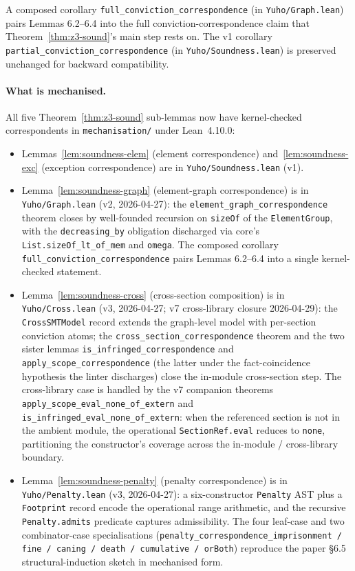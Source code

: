 A composed corollary \texttt{full\_conviction\_correspondence}
(in \texttt{Yuho/Graph.lean}) pairs Lemmas 6.2--6.4 into the
full conviction-correspondence claim that
Theorem~\ref{thm:z3-sound}'s main step rests on. The v1
corollary \texttt{partial\_conviction\_correspondence} (in
\texttt{Yuho/Soundness.lean}) is preserved unchanged for
backward compatibility.

\paragraph{What is mechanised.}
All five Theorem~\ref{thm:z3-sound} sub-lemmas now have
kernel-checked correspondents in
\texttt{mechanisation/} under Lean~4.10.0:

\begin{itemize}
  \item Lemmas~\ref{lem:soundness-elem} (element correspondence)
    and~\ref{lem:soundness-exc} (exception correspondence) are
    in \texttt{Yuho/Soundness.lean} (v1).
  \item Lemma~\ref{lem:soundness-graph} (element-graph
    correspondence) is in \texttt{Yuho/Graph.lean} (v2,
    2026-04-27): the
    \texttt{element\_graph\_correspondence} theorem closes by
    well-founded recursion on \texttt{sizeOf} of the
    \texttt{ElementGroup}, with the \texttt{decreasing\_by}
    obligation discharged via core's
    \texttt{List.sizeOf\_lt\_of\_mem} and \texttt{omega}. The
    composed corollary
    \texttt{full\_conviction\_correspondence} pairs Lemmas
    6.2--6.4 into a single kernel-checked statement.
  \item Lemma~\ref{lem:soundness-cross} (cross-section
    composition) is in \texttt{Yuho/Cross.lean} (v3,
    2026-04-27; v7 cross-library closure 2026-04-29): the
    \texttt{CrossSMTModel} record extends the graph-level model
    with per-section conviction atoms; the
    \texttt{cross\_section\_correspondence} theorem and the two
    sister lemmas \texttt{is\_infringed\_correspondence} and
    \texttt{apply\_scope\_correspondence} (the latter under the
    fact-coincidence hypothesis the linter discharges) close the
    in-module cross-section step. The cross-library case is
    handled by the v7 companion theorems
    \texttt{apply\_scope\_eval\_none\_of\_extern} and
    \texttt{is\_infringed\_eval\_none\_of\_extern}: when the
    referenced section is not in the ambient module, the
    operational \texttt{SectionRef.eval} reduces to
    \texttt{none}, partitioning the constructor's coverage
    across the in-module / cross-library boundary.
  \item Lemma~\ref{lem:soundness-penalty} (penalty
    correspondence) is in \texttt{Yuho/Penalty.lean} (v3,
    2026-04-27): a six-constructor \texttt{Penalty} AST plus a
    \texttt{Footprint} record encode the operational range
    arithmetic, and the recursive \texttt{Penalty.admits}
    predicate captures admissibility. The four leaf-case and two
    combinator-case specialisations
    (\texttt{penalty\_correspondence\_imprisonment / fine /
    caning / death / cumulative / orBoth}) reproduce the paper
    §6.5 structural-induction sketch in mechanised form.
\end{itemize}

